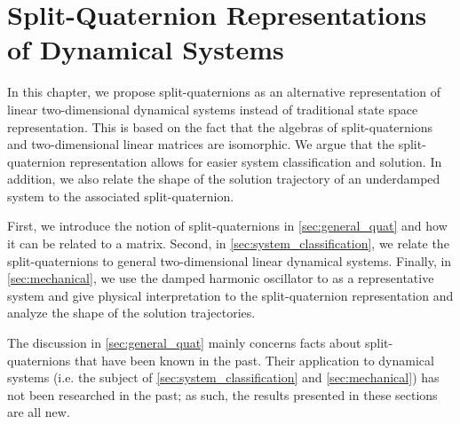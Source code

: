 \chapter{Split-Quaternion Representations of Dynamical Systems}
\label{chap:quaternion}
In this chapter, we propose split-quaternions as an alternative representation of linear two-dimensional dynamical systems instead of traditional state space representation. This is based on the fact that the algebras of split-quaternions and two-dimensional linear matrices are isomorphic. We argue that the split-quaternion representation allows for easier system classification and solution. In addition, we also relate the shape of the solution trajectory of an underdamped system to the associated split-quaternion.

First, we introduce the notion of split-quaternions in \cref{sec:general_quat} and how it can be related to a matrix. Second, in \cref{sec:system_classification}, we relate the split-quaternions to general two-dimensional linear dynamical systems. Finally, in \cref{sec:mechanical}, we use the damped harmonic oscillator to as a representative system and give physical interpretation to the split-quaternion representation and analyze the shape of the solution trajectories. 

The discussion in \cref{sec:general_quat} mainly concerns facts about split-quaternions that have been known in the past. Their application to dynamical systems (i.e. the subject of \cref{sec:system_classification} and \cref{sec:mechanical}) has not been researched in the past; as such, the results presented in these sections are all new.






